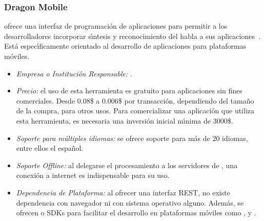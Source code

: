 \subsubsection{Dragon Mobile}
\label{sec:dragonmobile}

 ofrece una interfaz de programaci\'on de aplicaciones para permitir
a los desarrolladores incorporar s{\'\i}ntesis y reconocimiento del habla a sus
\mbox{aplicaciones \cite{DragonMobile}}. Est\'a espec{\'\i}ficamente orientado al desarrollo de
aplicaciones para plataformas m\'oviles.

\begin{itemize}
	\item \emph{Empresa o Instituci\'on Responsable:} .
	\item \emph{Precio:} el uso de esta herramienta es gratuito para aplicaciones sin fines comerciales.
	Desde 0.08\$ a 0.006\$ por transacci\'on, dependiendo del tama\~no de la compra, para otros usos.
	Para comercializar una aplicaci\'on que utiliza esta herramienta, es necesaria una inversi\'on inicial
	m{\'\i}nima de 3000\$.
	\item \emph{Soporte para m\'ultiples idiomas:} se ofrece soporte para m\'as de 20 idiomas, entre ellos
	el espa\~nol.
	\item \emph{Soporte Offline:} al delegarse el procesamiento a los servidores de ,
	una conexi\'on a internet es indispensable para su uso.
	\item \emph{Dependencia de Plataforma:} al ofrecer una interfaz REST, no existe dependencia con navegador
	ni con sistema operativo alguno. Adem\'as, se ofrecen  o SDKs para facilitar
	el desarrollo en plataformas m\'oviles como ,  y .
\end{itemize}